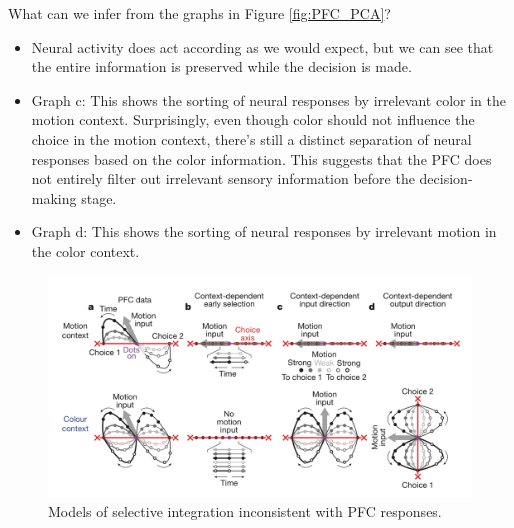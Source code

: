 \documentclass[11pt]{book} %
\begin{document}
What can we infer from the graphs in Figure \ref{fig:PFC_PCA}?
\begin{itemize}
    \item Neural activity does act according as we would expect, but we can see that the entire information is preserved while the decision is made.
    \item Graph c: This shows the sorting of neural responses by irrelevant color in the motion context. 
    Surprisingly, even though color should not influence the choice in the motion context, there's still a distinct separation of neural responses 
    based on the color information. This suggests that the PFC does not entirely filter out irrelevant sensory information before the decision-making stage.
    \item Graph d: This shows the sorting of neural responses by irrelevant motion in the color context.
\end{itemize}

\begin{figure}[h]
    \centering
    \includegraphics[width=\textwidth]{./Figs/PFC4.jpeg}
    \caption{Models of selective integration inconsistent with PFC responses.}
    \label{fig:PFC_models}
\end{figure}
\end{document}
